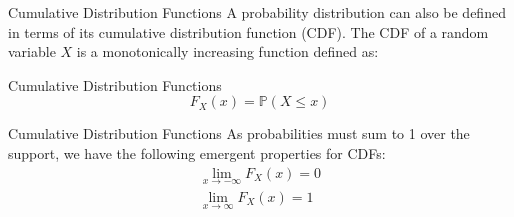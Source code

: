 \documentclass[10pt]{beamer}
\begin{document}
\begin{frame}[fragile]{Cumulative Distribution Functions}
A probability distribution can also be defined in terms of its cumulative distribution function (CDF). The CDF of a random variable \(X\) is a monotonically increasing function defined as:
\begin{alertblock}{Cumulative Distribution Functions}
\begin{equation*}
    F_X\left(x\right) = \mathbb{P}\left(X \leq x\right)
\end{equation*}
\end{alertblock}
\end{frame}

\begin{frame}[fragile]{Cumulative Distribution Functions}
As probabilities must sum to 1 over the support, we have the following emergent properties for CDFs:
\begin{equation*}\begin{aligned}
    \lim_{x\rightarrow-\infty}F_X\left(x\right) = 0\\
    \lim_{x\rightarrow\infty}F_X\left(x\right) = 1
\end{aligned}\end{equation*}
\end{frame}
\end{document}
